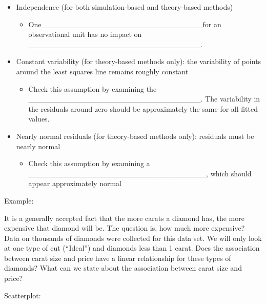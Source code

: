 \documentclass[
]{report}
\providecommand{\tightlist}{%
  \setlength{\itemsep}{0pt}\setlength{\parskip}{0pt}}
\begin{document}
\begin{itemize}
\item
  Independence (for both simulation-based and theory-based methods)

  \begin{itemize}
  \tightlist
  \item
    One\_\_\_\_\_\_\_\_\_\_\_\_\_\_\_\_\_\_\_\_\_\_\_\_\_\_\_\_\_\_for an observational unit has no impact on \_\_\_\_\_\_\_\_\_\_\_\_\_\_\_\_\_\_\_\_\_\_\_\_\_\_\_\_\_\_\_\_.
  \end{itemize}
\item
  Constant variability (for theory-based methods only): the variability of points around the least squares line remains roughly constant

  \begin{itemize}
  \tightlist
  \item
    Check this assumption by examining the \_\_\_\_\_\_\_\_\_\_\_\_\_\_\_\_\_\_\_\_\_\_\_\_\_\_\_\_\_\_\_\_. The variability in the residuals around zero should be approximately the same for all fitted values.
  \end{itemize}
\item
  Nearly normal residuals (for theory-based methods only): residuals must be nearly normal

  \begin{itemize}
  \tightlist
  \item
    Check this assumption by examining a \_\_\_\_\_\_\_\_\_\_\_\_\_\_\_\_\_\_\_\_\_\_\_\_\_\_\_\_\_\_\_\_\_, which should appear approximately normal
  \end{itemize}
\end{itemize}


Example:

It is a generally accepted fact that the more carats a diamond has, the more expensive that diamond will be. The question is, how much more expensive? Data on thousands of diamonds were collected for this data set. We will only look at one type of cut (``Ideal'') and diamonds less than 1 carat. Does the association between carat size and price have a linear relationship for these types of diamonds? What can we state about the association between carat size and price?

Scatterplot:
\end{document}
